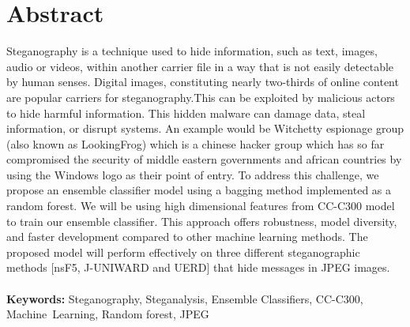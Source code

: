 \chapter*{Abstract} 
\thispagestyle{plain}
\setcounter{page}{1}
\sloppy
Steganography is a technique used to hide information, such as text, images, audio or videos, within another carrier file in a way that is not easily detectable by human senses. Digital images, constituting nearly two-thirds of online content are popular carriers for steganography.This can be exploited by malicious actors to hide harmful information. This hidden malware can damage data, steal information, or disrupt systems. An example would be Witchetty espionage group (also known as LookingFrog) which is a chinese hacker group which has so far compromised the security of middle eastern governments and african countries by using the Windows logo as their point of entry. To address this challenge, we propose an ensemble classifier model using a bagging method implemented as a random forest. We will be using high dimensional features from CC-C300 model to train our ensemble classifier. This approach offers robustness, model diversity, and faster development compared to other machine learning methods. The proposed model will perform effectively on three different steganographic methods [nsF5, J-UNIWARD and UERD]  that hide messages in JPEG images.\\ \\
\normalsize{\textbf{Keywords:} Steganography, Steganalysis, Ensemble Classifiers, CC-C300, \mbox{Machine Learning}, Random forest, JPEG }


